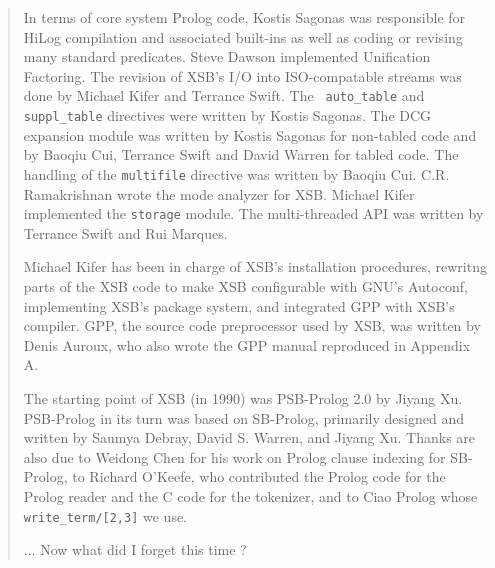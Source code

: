 \begin{quote}
In terms of core system Prolog code, Kostis Sagonas was responsible
for HiLog compilation and associated built-ins as well as coding or
revising many standard predicates.  Steve Dawson implemented
Unification Factoring.  The revision of XSB's I/O into ISO-compatable
streams was done by Michael Kifer and Terrance Swift.  The {\tt
  auto\_table} and {\tt suppl\_table} directives were written by
Kostis Sagonas.  The DCG expansion module was written by Kostis
Sagonas for non-tabled code and by Baoqiu Cui, Terrance Swift and
David Warren for tabled code.  The handling of the {\tt multifile}
directive was written by Baoqiu Cui. C.R. Ramakrishnan wrote the mode
analyzer for XSB.  Michael Kifer implemented the {\tt storage} module.
The multi-threaded API was written by Terrance Swift and Rui Marques.

Michael Kifer has been in charge of XSB's installation procedures,
rewritng parts of the XSB code to make XSB configurable with GNU's
Autoconf, implementing XSB's package system, and integrated GPP with
XSB's compiler.  GPP, the source code preprocessor used by XSB, was
written by Denis Auroux, who also wrote the GPP manual reproduced in
Appendix A.

The starting point of XSB (in 1990) was PSB-Prolog 2.0 by Jiyang Xu.
PSB-Prolog in its turn was based on SB-Prolog, primarily designed and
written by Saumya Debray, David S. Warren, and Jiyang Xu.  Thanks are
also due to Weidong Chen for his work on Prolog clause indexing for
SB-Prolog, to Richard O'Keefe, who contributed the Prolog code for the
Prolog reader and the C code for the tokenizer, and to Ciao Prolog
whose {\tt write\_term/[2,3]} we use.

... Now what did I forget this time ?

\end{quote}

